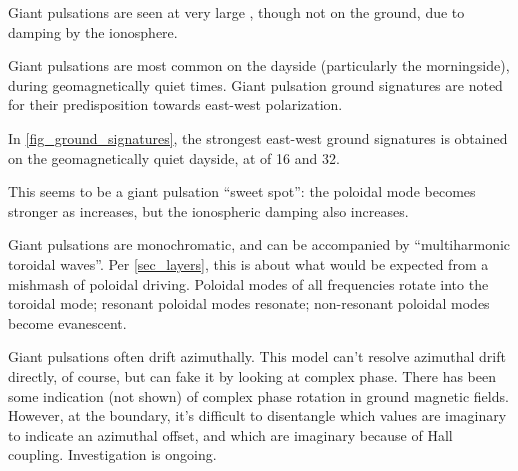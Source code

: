 



Giant pulsations are seen at very large \azm, though not on the ground\cite{takahashi_2013}, due to damping by the ionosphere. 

Giant pulsations are most common on the dayside (particularly the morningside), during geomagnetically quiet times. Giant pulsation ground signatures are noted for their predisposition towards east-west polarization. 

In \cref{fig_ground_signatures}, the strongest east-west ground signatures is obtained on the geomagnetically quiet dayside, at \azm of 16 and 32. 

This seems to be a giant pulsation ``sweet spot'': the poloidal mode becomes stronger as \azm increases, but the ionospheric damping also increases. 

Giant pulsations are monochromatic, and can be accompanied by ``multiharmonic toroidal waves''\cite{takahashi_2011}. Per \cref{sec_layers}, this is about what would be expected from a mishmash of poloidal driving. Poloidal modes of all frequencies rotate into the toroidal mode; resonant poloidal modes resonate; non-resonant poloidal modes become evanescent. 

Giant pulsations often drift azimuthally. This model can't resolve azimuthal drift directly, of course, but can fake it by looking at complex phase. There has been some indication (not shown) of complex phase rotation in ground magnetic fields. However, at the boundary, it's difficult to disentangle which values are imaginary to indicate an azimuthal offset, and which are imaginary because of Hall coupling. Investigation is ongoing. 
















